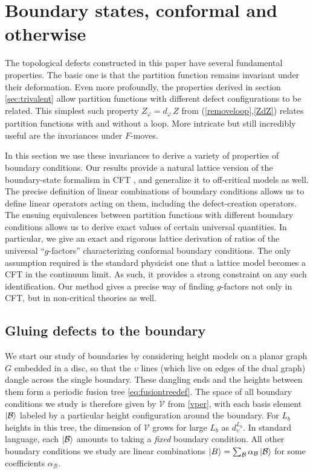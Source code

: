 

\section{Boundary states, conformal and otherwise}
\label{sec:bdry}

The topological defects constructed in this paper have several fundamental properties. The basic one is that the partition function remains invariant under their deformation. Even more profoundly, the properties derived in section \eqref{sec:trivalent} allow partition functions with different defect configurations to be related. This simplest such property $Z_\varphi = d_\varphi\,Z$ from (\ref{removeloop},\ref{ZdZ}) relates partition functions with and without a loop. More intricate but still incredibly useful are the invariances under  $F$-moves. 

In this section we use these invariances to derive a variety of properties of boundary conditions. Our results provide a natural lattice version of the boundary-state formalism in CFT \cite{Cardy1989}, and generalize it to off-critical models as well. The precise definition of linear combinations of boundary conditions allows us to define linear operators acting on them, including the defect-creation operators.  The ensuing equivalences between partition functions with different boundary conditions allows us to derive exact values of certain universal quantities. 
In particular, we give an exact and rigorous lattice derivation of ratios of the universal ``$g$-factors'' \cite{AffleckLudwig} characterizing conformal boundary conditions.  The only assumption required is the standard physicist one that a lattice model becomes a CFT in the continuum limit. As such, it provides a strong constraint on any such identification. Our method gives a precise way of finding $g$-factors not only in CFT, but in non-critical theories as well.

\subsection{Gluing defects to the boundary}
\label{sec:gluing}

We start our study of boundaries by considering height models on a planar graph $G$ embedded in a disc, so that the $\upsilon$ lines (which live on edges of the dual graph) dangle across the single boundary.  These dangling ends and the heights between them form a periodic fusion tree \eqref{eq:fusiontreedef}.  The space of all boundary conditions we study is therefore given by $\mathcal{V}$ from \eqref{vper}, with each basis element $\ket{\mathcal{B}}$ labeled by a particular height configuration around the boundary.
For $L_b$ heights in this tree, the dimension of $\mathcal{V}$ grows for large $L_b$ as $d_\upsilon^{L_b}$.
In standard language, each $\ket{\mathcal{B}}$ amounts to taking a {\em fixed} boundary condition.
All other boundary conditions we study are linear combinations $\ket{B} = \sum_{\mathcal{B}} \alpha_{\mathcal{B}} \ket{\mathcal B}$ for some coefficients $\alpha_{\mathcal B}$. 

